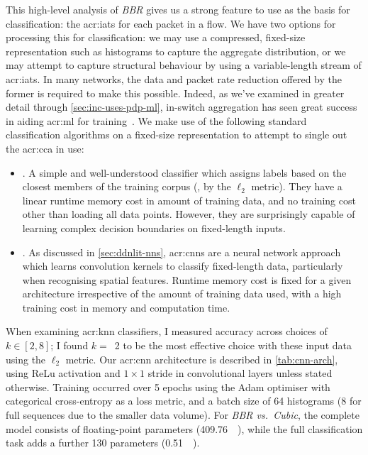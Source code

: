 This high-level analysis of \emph{BBR} gives us a strong feature to use as the basis for classification: the \glspl{acr:iat} for each packet in a flow.
We have two options for processing this for classification: we may use a compressed, fixed-size representation such as histograms to capture the aggregate distribution, or we may attempt to capture structural behaviour by using a variable-length stream of \glspl{acr:iat}.
In many networks, the data and packet rate reduction offered by the former is required to make this possible.
Indeed, as we've examined in greater detail through \cref{sec:inc-uses-pdp-ml}, in-switch aggregation has seen great success in aiding \gls{acr:ml} for training~\parencite{DBLP:conf/isca/LiLYCSH19}.
We make use of the following standard classification algorithms on a fixed-size representation to attempt to single out the \gls{acr:cca} in use:

\begin{itemize}
    \item {}. A simple and well-understood classifier which assigns labels based on the closest members of the training corpus (\ie, by the $\ell_2$ metric). They have a linear runtime memory cost in amount of training data, and no training cost other than loading all data points. However, they are surprisingly capable of learning complex decision boundaries on fixed-length inputs.
    
    \item {}. As discussed in \cref{sec:ddnlit-nns}, \glspl{acr:cnn} are a neural network approach which learns convolution kernels to classify fixed-length data, particularly when recognising spatial features. Runtime memory cost is fixed for a given architecture irrespective of the amount of training data used, with a high training cost in memory and computation time.
\end{itemize}

When examining \gls{acr:knn} classifiers, I measured accuracy across choices of $k \in \left[2, 8\right]$; I found $k=$~\num{2} to be the most effective choice with these input data using the $\ell_2$ metric.
Our \gls{acr:cnn} architecture is described in \cref{tab:cnn-arch}, using ReLu activation and $1 \times 1$ stride in convolutional layers unless stated otherwise.
Training occurred over 5 epochs using the Adam optimiser with categorical cross-entropy as a loss metric, and a batch size of \num{64} histograms (\num{8} for full sequences due to the smaller data volume).
For \emph{BBR vs.\ Cubic}, the complete model consists of  floating-point parameters (\qty{409.76}{\kibi\byte}), while the full classification task adds a further \num{130} parameters (\qty{0.51}{\kibi\byte}).


